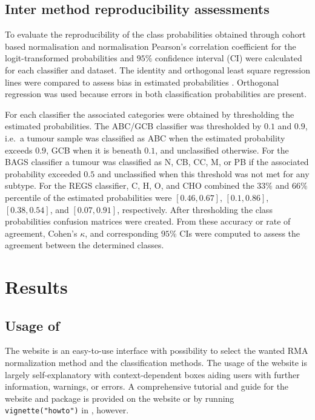 \documentclass{article}
\begin{document}
\subsection{Inter method reproducibility assessments}
To evaluate the reproducibility of the class probabilities obtained through cohort based normalisation and \hemaClass{} normalisation Pearson's correlation coefficient for the logit-transformed probabilities and $95\%$ confidence interval (CI) were calculated for each classifier and dataset.
The identity and orthogonal least square regression lines were compared to assess bias in estimated probabilities \citep{CHEN1989}.
Orthogonal regression was used because errors in both classification probabilities are present.

For each classifier the associated categories were obtained by thresholding the estimated probabilities.
The ABC/GCB classifier was thresholded by $0.1$ and $0.9$, i.e.\ a tumour sample was classified as ABC when the estimated probability exceeds $0.9$, GCB when it is beneath $0.1$, and unclassified otherwise.
For the BAGS classifier a tumour was classified as N, CB, CC, M, or PB if the associated probability exceeded $0.5$ and unclassified when this threshold was not met for any subtype.
For the REGS classifier, C, H, O, and CHO combined the $33\%$ and $66\%$ percentile of the estimated probabilities were $[0.46, 0.67]$, $[0.1, 0.86]$, $[0.38, 0.54]$, and $[0.07, 0.91]$, respectively.
After thresholding the class probabilities confusion matrices were created.
From these accuracy or rate of agreement, Cohen's $\kappa$, and corresponding $95\%$ CIs were computed to assess the agreement between the determined classes.


\section{Results}
\subsection{Usage of \hemaClass{}}
The website is an easy-to-use interface with possibility to select the wanted RMA normalization method and the classification methods.
The usage of the website is largely self-explanatory with context-dependent boxes aiding users with further information, warnings, or errors.
A comprehensive tutorial and guide for the  website and package is provided on the website or by running \texttt{vignette("howto")} in \R{}, however.
\end{document}

